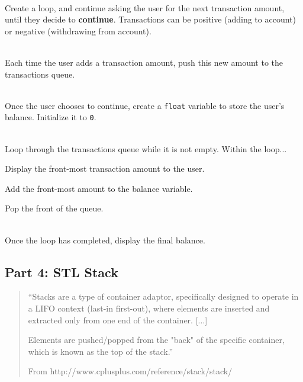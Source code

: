         ~\\ Create a loop, and continue asking the user for the next transaction amount,
        until they decide to \textbf{continue}. Transactions can be positive (adding to account)
        or negative (withdrawing from account).

        ~\\ Each time the user adds a transaction amount, push this new amount to the transactions queue.

        ~\\ Once the user chooses to continue, create a \texttt{float} variable to store the user's balance. Initialize it to \texttt{0}.

        ~\\ Loop through the transactions queue while it is not empty. Within the loop...

        Display the front-most transaction amount to the user.

        Add the front-most amount to the balance variable.

        Pop the front of the queue.

        ~\\ Once the loop has completed, display the final balance.

        
        
        \newpage
        \subsection{Part 4: STL Stack}

        \begin{mdframed}
            \begin{quote}
                ``Stacks are a type of container adaptor, specifically designed to operate in a LIFO context (last-in first-out), where elements are inserted and extracted only from one end of the container. [...]

                Elements are pushed/popped from the "back" of the specific container, which is known as the top of the stack.''

                \footnotesize{From http://www.cplusplus.com/reference/stack/stack/}
            \end{quote}
        \end{mdframed}

